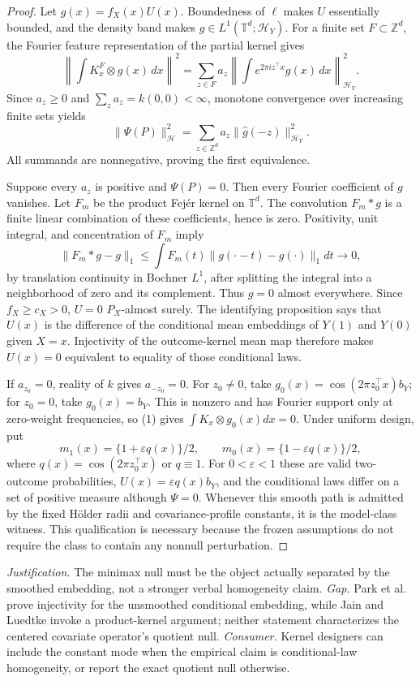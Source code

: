 \documentclass{article}
\begin{document}
\begin{proof}
Let \(g(x)=f_X(x)U(x)\). Boundedness of \(\ell\) makes \(U\) essentially bounded, and the density band makes \(g\in L^1(\mathbb T^d;\mathcal H_Y)\). For a finite set \(F\subset\mathbb Z^d\), the Fourier feature representation of the partial kernel gives
\[
\left\|\int K_x^F\otimes g(x)\,dx\right\|^2
=\sum_{z\in F}a_z\left\|\int e^{2\pi i z^\top x}g(x)\,dx\right\|_{\mathcal H_Y}^2.
\]
Since \(a_z\ge0\) and \(\sum_z a_z=k(0,0)<\infty\), monotone convergence over increasing finite sets yields
\[
\|\Psi(P)\|_{\mathcal H}^2
=\sum_{z\in\mathbb Z^d}a_z\|\widehat g(-z)\|_{\mathcal H_Y}^2. \tag{1}
\]
All summands are nonnegative, proving the first equivalence.

Suppose every \(a_z\) is positive and \(\Psi(P)=0\). Then every Fourier coefficient of \(g\) vanishes. Let \(F_m\) be the product Fejér kernel on \(\mathbb T^d\). The convolution \(F_m*g\) is a finite linear combination of these coefficients, hence is zero. Positivity, unit integral, and concentration of \(F_m\) imply
\[
\|F_m*g-g\|_1\le\int F_m(t)\|g(\cdot-t)-g(\cdot)\|_1dt\longrightarrow0,
\]
by translation continuity in Bochner \(L^1\), after splitting the integral into a neighborhood of zero and its complement. Thus \(g=0\) almost everywhere. Since \(f_X\ge c_X>0\), \(U=0\) \(P_X\)-almost surely. The identifying proposition says that \(U(x)\) is the difference of the conditional mean embeddings of \(Y(1)\) and \(Y(0)\) given \(X=x\). Injectivity of the outcome-kernel mean map therefore makes \(U(x)=0\) equivalent to equality of those conditional laws.

If \(a_{z_0}=0\), reality of \(k\) gives \(a_{-z_0}=0\). For \(z_0\ne0\), take \(g_0(x)=\cos(2\pi z_0^\top x)b_Y\); for \(z_0=0\), take \(g_0(x)=b_Y\). This is nonzero and has Fourier support only at zero-weight frequencies, so (1) gives \(\int K_x\otimes g_0(x)dx=0\). Under uniform design, put
\[
m_1(x)=\{1+\varepsilon q(x)\}/2,\qquad
m_0(x)=\{1-\varepsilon q(x)\}/2,
\]
where \(q(x)=\cos(2\pi z_0^\top x)\) or \(q\equiv1\). For \(0<\varepsilon<1\) these are valid two-outcome probabilities, \(U(x)=\varepsilon q(x)b_Y\), and the conditional laws differ on a set of positive measure although \(\Psi=0\). Whenever this smooth path is admitted by the fixed Hölder radii and covariance-profile constants, it is the model-class witness. This qualification is necessary because the frozen assumptions do not require the class to contain any nonnull perturbation.
\end{proof}
\par\smallskip\noindent \textit{Justification.} The minimax null must be the object actually separated by the smoothed embedding, not a stronger verbal homogeneity claim. \textit{Gap.} Park et al. prove injectivity for the unsmoothed conditional embedding, while Jain and Luedtke invoke a product-kernel argument; neither statement characterizes the centered covariate operator's quotient null. \textit{Consumer.} Kernel designers can include the constant mode when the empirical claim is conditional-law homogeneity, or report the exact quotient null otherwise.
\end{document}
